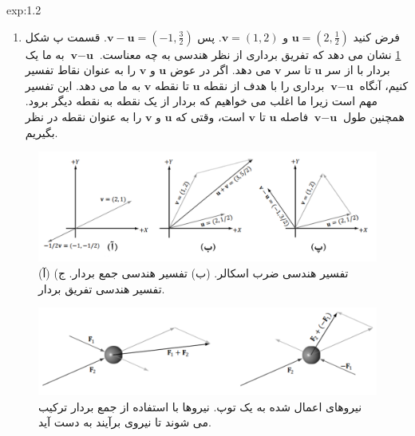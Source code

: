 {\begin{spacing}{1.5}
\begin{example}{exp:1.2}
\begin{enumerate}[label=\textbf{\arabic*}.]
                \item {فرض کنید $\textbf{u}=(2,\frac{\displaystyle 1}{\displaystyle 2})$ و $\textbf{v}=(1,2)$. پس $\textbf{v}-\textbf{u}=(-1,\frac{\displaystyle 3}{\displaystyle 2})$.
                قسمت پ شکل \ref{fig:4.Session.1.1.6} نشان می دهد که تفریق برداری از نظر هندسی به چه معناست.
                    $\textbf{v}-\textbf{u}$ به ما یک بردار با از سر $\textbf{u}$ تا سر $\textbf{v}$ می دهد.
                    اگر در عوض $\textbf{u}$ و $\textbf{v}$ را به عنوان نقاط تفسیر کنیم، آنگاه $\textbf{v}-\textbf{u}$ برداری را با هدف از نقطه $\textbf{u}$ تا نقطه $\textbf{v}$ به ما می دهد.
                    این تفسیر مهم است زیرا ما اغلب می خواهیم که بردار از یک نقطه به نقطه دیگر برود.
                    همچنین طول $\textbf{v}-\textbf{u}$ فاصله $\textbf{u}$ تا $\textbf{v}$ است، وقتی که $\textbf{u}$ و $\textbf{v}$ را به عنوان نقطه در نظر بگیریم.}
            \end{enumerate}

            \begin{figure}[H]
                \centering
                \setlength{\belowcaptionskip}{-10pt}
                \includegraphics[width=\textwidth]{Images/4/1/4.Session.1.1.6}
                \caption{(آ) تفسیر هندسی ضرب اسکالر. (ب) تفسیر هندسی جمع بردار. ج) تفسیر هندسی تفریق بردار.}
                \label{fig:4.Session.1.1.6}
            \end{figure}

            \begin{figure}[H]
                \centering
                \setlength{\belowcaptionskip}{-10pt}
                \includegraphics[width=\textwidth]{Images/4/1/4.Session.1.1.7}
                \caption{نیروهای اعمال شده به یک توپ. نیروها با استفاده از جمع بردار ترکیب می شوند تا نیروی برآیند به دست آید. \textbf{\vspace{10pt}}}
                \label{fig:4.Session.1.1.7}
            \end{figure}
        \end{example}
    \end{spacing}
}


